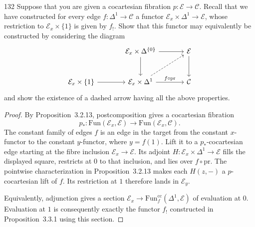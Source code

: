 \begin{exercise}{132}
Suppose that you are given a cocartesian fibration $p\colon\mathcal E\to\mathcal C$. Recall that we
have constructed for every edge $f\colon\Delta^1\to\mathcal C$ a functor $\mathcal E_x\times\Delta^1\to\mathcal E$, whose restriction to
$\mathcal E_x\times\{1\}$ is given by $f_!$. Show that this functor may equivalently be constructed by considering
the diagram
\[
\begin{tikzcd}[column sep=large,row sep=large]
 & \mathcal E_x\times\Delta^{\{0\}}\arrow[r]\arrow[d] & \mathcal E\arrow[d] \\
 \mathcal E_x\times\{1\}\arrow[r] &
 \mathcal E_x\times\Delta^1\arrow[r,"f\circ\mathrm{pr}"]\arrow[ur,dashed] & \mathcal C
\end{tikzcd}
\]
and show the existence of a dashed arrow having all the above properties.

\begin{proof}
By Proposition~3.2.13, postcomposition gives a cocartesian fibration
\[
 p_*\colon\mathrm{Fun}(\mathcal E_x,\mathcal E)
 \longrightarrow\mathrm{Fun}(\mathcal E_x,\mathcal C).
\]
The constant family of edges $f$ is an edge in the target from the
constant $x$-functor to the constant $y$-functor, where $y=f(1)$.
Lift it to a $p_*$-cocartesian edge starting at the fibre inclusion
$\mathcal E_x\to\mathcal E$.
Its adjoint $H\colon\mathcal E_x\times\Delta^1\to\mathcal E$ fills the
displayed square, restricts at $0$ to that inclusion, and lies over
$f\circ\mathrm{pr}$.
The pointwise characterization in Proposition~3.2.13 makes each
$H(z,-)$ a $p$-cocartesian lift of $f$.
Its restriction at $1$ therefore lands in $\mathcal E_y$.

Equivalently, adjunction gives a section
$\mathcal E_x\to\mathrm{Fun}^{\mathrm{cc}}_f(\Delta^1,\mathcal E)$
of evaluation at $0$.
Evaluation at $1$ is consequently exactly the functor $f_!$ constructed
in Proposition~3.3.1 using this section.
\end{proof}
\end{exercise}
